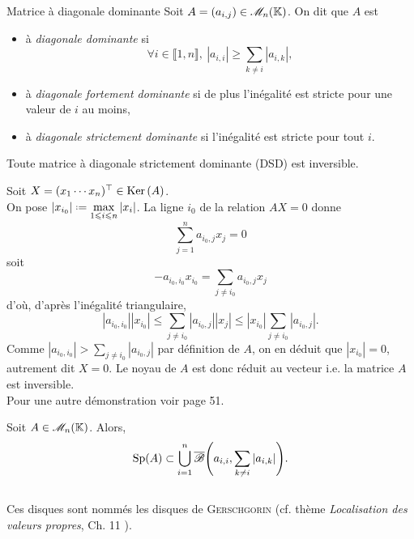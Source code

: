 \begin{defi}{Matrice à diagonale dominante}
    Soit $A = (a_{i,j}) \in \mathscr{M}_n(\mathbb{K})$. On dit que $A$ est 
    \begin{itemize}
        \item à \emph{diagonale dominante} si
        $$\forall i \in \llbracket 1, n \rrbracket,\ |a_{i,i}| \geqslant \sum_{k \not = i} |a_{i,k}|,$$
        \item à \emph{diagonale fortement dominante} si de plus l'inégalité est stricte pour une valeur de $i$ au moins,
        \item à \emph{diagonale strictement dominante} si l'inégalité est stricte pour tout $i$. 
    \end{itemize}
\end{defi}

\begin{lemme} \label{lemme_hadamard}
    Toute matrice à diagonale strictement dominante (DSD) est inversible.
\end{lemme}


\begin{preuve}
    Soit $X = (x_1 \cdots x_n)^\top \in \mathrm{Ker}\,(A)$. \\
    On pose $\displaystyle \left |x_{i_0} \right| \defeq \max_{1 \leqslant i \leqslant n} |x_i|$. La ligne $i_0$ de la relation $AX = 0$ donne
    $$\sum_{j=1}^n a_{i_0,j}x_j = 0$$
    soit
    $$-a_{i_0, i_0} x_{i_0} = \sum_{j \not = i_0} a_{i_0,j} x_j$$
    d'où, d'après l'inégalité triangulaire,
    $$|a_{i_0, i_0}| |x_{i_0}| \leqslant \sum_{j \not = i_0} |a_{i_0,j}| |x_j| \leqslant |x_{i_0}| \sum_{j \not = i_0} |a_{i_0, j}|.$$
    Comme $|a_{i_0, i_0}| > \sum\limits_{j \not = i_0} |a_{i_0, j}|$ par définition de $A$, on en déduit que
    $|x_{i_0}| = 0$, autrement dit $X = 0$. Le noyau de $A$ est donc réduit au vecteur i.e. la matrice $A$ est inversible. \\
    Pour une autre démonstration voir \cite{matrices} page 51. 
\end{preuve}

\begin{theo}{}
    Soit $A \in \mathscr{M}_n(\mathbb{K})$. Alors, $$\mathrm{Sp}(A) \subset \bigcup\limits_{i=1}^{n} \overline{\mathscr{B}} \Bigg( a_{i,i}, \sum\limits_{k \not = i} |a_{i,k}| \Bigg).$$ \\
    Ces disques sont nommés les disques de \textsc{Gerschgorin} \note (cf. thème \textit{Localisation des valeurs propres}, Ch. 11 \cite{acamanes}).
\end{theo}

